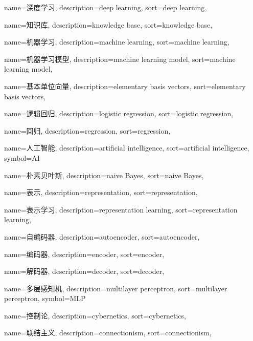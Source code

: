 {
  name=深度学习,
  description={deep learning},
  sort={deep learning},
}

{
  name=知识库,
  description={knowledge base},
  sort={knowledge base},
}

{
  name=机器学习,
  description={machine learning},
  sort={machine learning},
}

{
  name=机器学习模型,
  description={machine learning model},
  sort={machine learning model},
}

{
  name=基本单位向量,
  description={elementary basis vectors},
  sort={elementary basis vectors},
}

{
  name=逻辑回归,
  description={logistic regression},
  sort={logistic regression},
}

{
  name=回归,
  description={regression},
  sort={regression},
}

{
  name=人工智能,
  description={artificial intelligence},
  sort={artificial intelligence},
  symbol={AI}
}

{
  name=朴素贝叶斯,
  description={naive Bayes},
  sort={naive Bayes},
}

{
  name=表示,
  description={representation},
  sort={representation},
}

{
  name=表示学习,
  description={representation learning},
  sort={representation learning},
}

{
  name=自编码器,
  description={autoencoder},
  sort={autoencoder},
}

{
  name=编码器,
  description={encoder},
  sort={encoder},
}

{
  name=解码器,
  description={decoder},
  sort={decoder},
}

{
  name=多层感知机,
  description={multilayer perceptron},
  sort={multilayer perceptron},
  symbol={MLP}
}

{
  name=控制论,
  description={cybernetics},
  sort={cybernetics},
}

{
  name=联结主义,
  description={connectionism},
  sort={connectionism},
}

